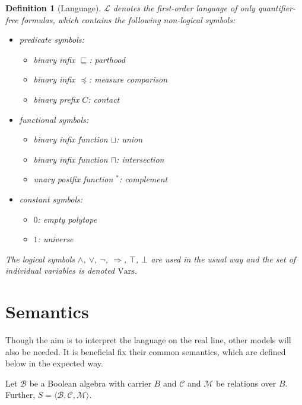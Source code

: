\documentclass{article}
\newtheorem*{definition}{Definition}
\newcommand{\B}{\mathcal{B}}
\newcommand{\lang}{\mathcal{L}}
\newcommand{\Vars}{\text{Vars}}
\newcommand{\lcup}{\sqcup}
\newcommand{\lcap}{\sqcap}
\newcommand{\lstar}{^*}
\newcommand{\lpart}{\sqsubseteq}
\newcommand{\lcont}{C}
\newcommand{\lmeasure}{\preceq}
\begin{document}
\begin{definition}[Language]
$\lang$ denotes the first-order language of only quantifier-free formulas, which contains the following non-logical symbols:
\begin{itemize}
  \item predicate symbols:
  \begin{itemize}
  \item binary infix $\lpart$: parthood
  \item binary infix $\lmeasure$: measure comparison
  \item binary prefix $\lcont$: contact
  \end{itemize}
  \item functional symbols:
  \begin{itemize}
  \item binary infix function $\lcup$: union
  \item binary infix function $\lcap$: intersection
  \item unary postfix function $\lstar$: complement
  \end{itemize}
  \item constant symbols:
  \begin{itemize}
  \item $0$: empty polytope
  \item $1$: universe
  \end{itemize}
\end{itemize}

The logical symbols $\land$, $\lor$, $\lnot$, $\Rightarrow$, $\top$, $\bot$ are used in the usual way and the set of individual variables is denoted $\Vars$.

\end{definition}

\section{Semantics}

Though the aim is to interpret the language on the real line, other models will also be needed. It is beneficial fix their common semantics, which are defined below in the expected way.

Let $\B$ be a Boolean algebra with carrier $B$ and $\mathcal{C}$ and $\mathcal{M}$ be relations over $B$. Further, $S = \langle \B, \mathcal{C}, \mathcal{M} \rangle$.
\end{document}
